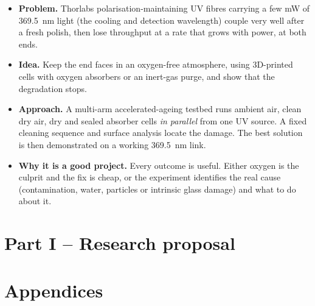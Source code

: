 \documentclass[11pt,a4paper]{article}
\begin{document}
\begin{titlepage}
\vfill
\begin{keybox}
\begin{itemize}[leftmargin=1.1em]
  \item \textbf{Problem.} Thorlabs polarisation-maintaining UV fibres carrying a few mW of
        \SI{369.5}{nm} light (the \Ybion{} cooling and detection wavelength) couple very well after a
        fresh polish, then lose throughput at a rate that grows with power, at both ends.
  \item \textbf{Idea.} Keep the end faces in an oxygen-free atmosphere, using 3D-printed cells with oxygen
        absorbers or an inert-gas purge, and show that the degradation stops.
  \item \textbf{Approach.} A multi-arm accelerated-ageing testbed runs ambient air, clean dry air, dry
        \Ntwo{} and sealed absorber cells \emph{in parallel} from one UV source. A fixed cleaning sequence
        and surface analysis locate the damage. The best solution is then demonstrated on a working
        \SI{369.5}{nm} link.
  \item \textbf{Why it is a good project.} Every outcome is useful. Either oxygen is the culprit and the
        fix is cheap, or the experiment identifies the real cause (contamination, water, particles or
        intrinsic glass damage) and what to do about it.
\end{itemize}
\end{keybox}
\end{titlepage}

\tableofcontents
\clearpage

\part*{Part I -- Research proposal}
















\clearpage



\clearpage
\appendix
\part*{Appendices}



\clearpage
\printbibliography[heading=bibintoc,title={References}]
\end{document}
